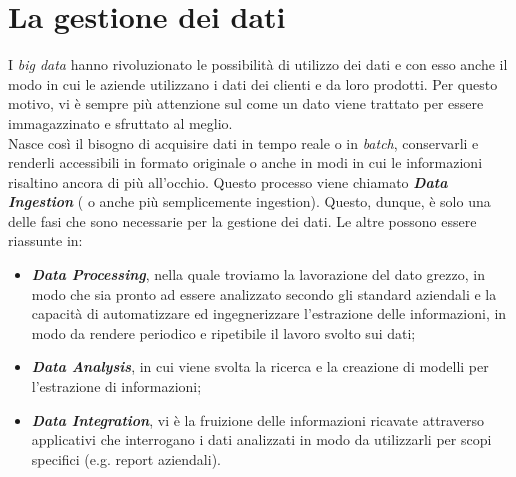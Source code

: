 \section{La gestione dei dati}
I \emph{big data} hanno rivoluzionato le possibilità di utilizzo dei dati e con esso anche il modo in cui le aziende utilizzano i dati dei clienti e da loro prodotti. Per questo motivo, vi è sempre più attenzione sul come un dato viene trattato per essere immagazzinato e sfruttato al meglio.
\\
Nasce così il bisogno di acquisire dati in tempo reale o in \emph{batch}, conservarli e renderli accessibili in formato originale o anche in modi in cui le informazioni risaltino ancora di più all'occhio.
Questo processo viene chiamato \emph{\textbf{Data Ingestion}} ( o anche più semplicemente ingestion).
Questo, dunque, è solo una delle fasi che sono necessarie per la gestione dei dati.
Le altre possono essere riassunte in:
\begin{itemize}
	\item \emph{\textbf{Data Processing}}, nella quale troviamo la lavorazione del dato grezzo, in modo che sia pronto ad essere analizzato secondo gli standard aziendali e la capacità di automatizzare ed ingegnerizzare l'estrazione delle informazioni, in modo da rendere periodico e ripetibile il lavoro svolto sui dati;
	\item \emph{\textbf{Data Analysis}}, in cui viene svolta la ricerca e la creazione di modelli per l'estrazione di informazioni;
	\item \emph{\textbf{Data Integration}}, vi è la fruizione delle informazioni ricavate attraverso applicativi che interrogano i dati analizzati in modo da utilizzarli per scopi specifici (e.g. report aziendali).
\end{itemize}

